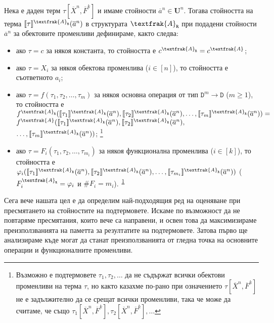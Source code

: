 \documentclass[12pt,twoside,a4paper]{article}
\begin{document}
	\begin{definition}\label{def:term-value}~\\
		\indent Нека е даден терм $\tau[\overline{X}^n,\overline{F}^k]$ и имаме стойности $\overline{a}^n \in \mathbf{U}^n$. Тогава стойността на терма $\llbracket\tau\rrbracket^{\textfrak{A}_\texttt{R}}(\overline{a}^n)$ в структурата $\textfrak{A}_\texttt{R}$ при подадени стойности $\overline{a}^n$ за обектовите променливи дефинираме, както следва:
		\begin{itemize}
			\item ако $\tau = c$ за някоя константа, то стойността е $c^{\textfrak{A}_\texttt{R}} = c^\textfrak{A}$;
			\item ако $\tau = X_i$ за някоя обектова променлива ($i \in [n]$), то стойността е съответното $a_i$;
			\item ако $\tau = f(\tau_1,\tau_2,\dots,\tau_m)$ за някоя основна операция от тип $\texttt{D}^{m} \to \texttt{D}$ ($m \ge 1$), то стойността е $f^{\textfrak{A}_\texttt{R}}(\llbracket\tau_1\rrbracket^{\textfrak{A}_\texttt{R}}(\overline{a}^n),\llbracket\tau_2\rrbracket^{\textfrak{A}_\texttt{R}}(\overline{a}^n),\dots,\llbracket\tau_m\rrbracket^{\textfrak{A}_\texttt{R}}(\overline{a}^n)) = $ $f^\textfrak{A}(\llbracket\tau_1\rrbracket^{\textfrak{A}_\texttt{R}}(\overline{a}^n),\llbracket\tau_2\rrbracket^{\textfrak{A}_\texttt{R}}(\overline{a}^n),$ $\dots,\llbracket\tau_m\rrbracket^{\textfrak{A}_\texttt{R}}(\overline{a}^n))$; \footnote{\label{note:term-value}Възможно е подтермовете $\tau_1, \tau_2, \dots$ да не съдържат всички обектови променливи на терма $\tau$, но както казахме по-рано при означението $\tau[\overline{X}^n,\overline{F}^k]$ не е задължително да се срещат всички променливи, така че може да считаме, че също $\tau_1[\overline{X}^n,\overline{F}^k], \tau_2[\overline{X}^n,\overline{F}^k] , \dots$}
			\item ако $\tau = F_i(\tau_1,\tau_2,\dots,\tau_{m_i})$ за някоя функционална променлива ($i \in [k]$), то стойността е $\varphi_i(\llbracket\tau_1\rrbracket^{\textfrak{A}_\texttt{R}}(\overline{a}^n),\llbracket\tau_2\rrbracket^{\textfrak{A}_\texttt{R}}(\overline{a}^n),\dots,\llbracket\tau_{m_i}\rrbracket^{\textfrak{A}_\texttt{R}}(\overline{a}^n))$ ($F_i^{\textfrak{A}_\texttt{R}} = \varphi_i$ и $\#F_i = m_i$).\textsuperscript{~\ref{note:term-value}}
		\end{itemize}
	\end{definition}
	
	Сега вече нашата цел е да определим най-подходящия ред на оценяване при пресмятането на стойностите на подтермовете. Искаме по възможност да не повтаряме пресмятания, които вече са направени, и освен това да максимизираме преизползванията на паметта за резултатите на подтермовете. Затова първо ще анализираме къде могат да станат преизползванията от гледна точка на основните операции и функционалните променливи.
	
\end{document}
